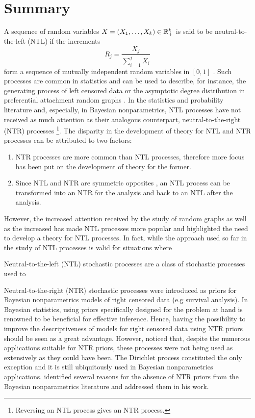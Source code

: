 

\section{Summary}
A sequence of random variables $X = (X_1, \ldots, X_k) \in \mathbb{R}^k_+$ is said to be neutral-to-the-left (NTL) if the increments 
\begin{equation*}
R_j = \frac{X_j}{\sum_{i=1}^j X_i}
\end{equation*} 
form a sequence of mutually independent random variables in $[0, 1]$ \cite{bloem2018sampling}. Such processes are common in statistics and can be used to describe, for instance, the generating process of left censored data or the asymptotic degree distribution in preferential attachment random graphs \cite{bloem2017preferential}. In the statistics and probability literature and, especially, in Bayesian nonparametrics, NTL processes have not received as much attention as their analogous counterpart, neutral-to-the-right (NTR) processes \footnote{Reversing an NTL process gives an NTR process.}. The disparity in the development of theory for NTL and NTR processes can be attributed to two factors:

\begin{enumerate}
	\item NTR processes are more common than NTL processes, therefore more focus has been put on the development of theory for the former.
	\item Since NTL and NTR are symmetric opposites \cite{bloem2018sampling}, an NTL process can be transformed into an NTR for the analysis and back to an NTL after the analysis.
\end{enumerate}


However, the increased attention received by the study of random graphs as well as the increased has made NTL processes more popular and highlighted the need to develop a theory for NTL processes. In fact, while the approach used so far in the study of NTL processes is valid for situations where 

Neutral-to-the-left (NTL) stochastic processes are a class of stochastic processes used to 


Neutral-to-the-right (NTR) stochastic processes \cite{doksum1974tailfree} were introduced as priors for Bayesian nonparametrics models of right censored data (e.g survival analysis). In Bayesian statistics, using priors specifically designed for the problem at hand is renowned to be beneficial for effective inference. Hence, having the possibility to improve the descriptiveness of models for right censored data using NTR priors should be seen as a great advantage. However, \cite{james2006poisson} noticed that, despite the numerous applications suitable for NTR priors, these processes were not being used as extensively as they could have been. The Dirichlet process constituted the only exception and it is still ubiquitously used in Bayesian nonparametrics applications. \cite{james2006poisson} identified several reasons for the absence of NTR priors from the Bayesian nonparametrics literature and addressed them in his work.

